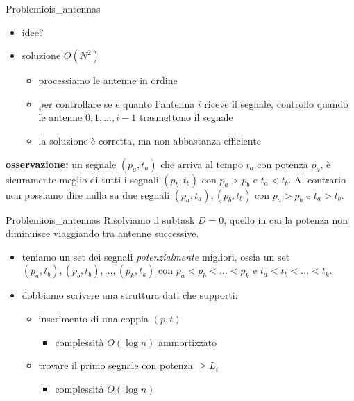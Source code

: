 \documentclass[compress]{beamer}
\begin{document}
\begin{frame}{Problemi}{ois\_antennas}
    \begin{itemize}
        \item idee?
        \pause
        \item soluzione $O(N^2)$
        \begin{itemize}
            \item processiamo le antenne in ordine
            \item per controllare se e quanto l'antenna $i$ riceve il segnale, controllo quando le antenne $0, 1, \dots, i-1$ trasmettono il segnale
            \item la soluzione \`e corretta, ma non abbastanza efficiente
        \end{itemize}
    \end{itemize}
    \pause
    \textbf{osservazione:} un segnale $(p_a, t_a)$ che arriva al tempo $t_a$ con potenza $p_a$, \`e sicuramente meglio di tutti i segnali $(p_b, t_b)$ con $p_a > p_b$ e $t_a < t_b$.
    \pause
    Al contrario non possiamo dire nulla su due segnali $(p_a, t_a), (p_b, t_b)$ con $p_a > p_b$ e $t_a > t_b$.
\end{frame}


\begin{frame}{Problemi}{ois\_antennas}
    Risolviamo il subtask $D = 0$, quello in cui la potenza non diminuisce viaggiando tra antenne successive.
    \begin{itemize}
        \item teniamo un set dei segnali \textit{potenzialmente} migliori, ossia un set $(p_a, t_b), (p_b, t_b), \dots , (p_k, t_k)$ con $p_a < p_b < \dots < p_k$ e $t_a < t_b < \dots < t_k$.
        \pause
        \item dobbiamo scrivere una struttura dati che supporti:
        \pause
        \begin{itemize}
            \item inserimento di una coppia $(p, t)$
            \begin{itemize}
                \item complessit\`a $O(\log n)$ ammortizzato
            \end{itemize}
            \pause
            \item trovare il primo segnale con potenza $\geq L_i$
            \begin{itemize}
                \item complessit\`a $O(\log n)$
            \end{itemize}
        \end{itemize}
    \end{itemize}
\end{frame}
\end{document}
